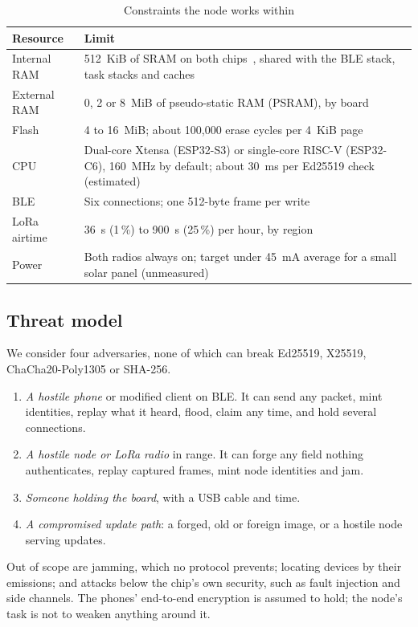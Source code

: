 \documentclass[conference]{IEEEtran}
\begin{document}
\begin{table}[t]
\caption{Constraints the node works within}
\label{tab:constraints}
\centering
\scriptsize
\begin{tabular}{@{}L{1.75cm}L{5.95cm}@{}}
\toprule
Resource & Limit \\
\midrule
Internal RAM & 512~KiB of SRAM on both chips~\cite{esp32s3,esp32c6}, shared with the BLE stack, task stacks and caches \\
External RAM & 0, 2 or 8~MiB of pseudo-static RAM (PSRAM), by board \\
Flash & 4 to 16~MiB; about 100{,}000 erase cycles per 4~KiB page \\
CPU & Dual-core Xtensa (ESP32-S3) or single-core RISC-V (ESP32-C6), 160~MHz by default; about 30~ms per Ed25519 check (estimated) \\
BLE & Six connections; one 512-byte frame per write \\
LoRa airtime & 36~s (1\,\%) to 900~s (25\,\%) per hour, by region \\
Power & Both radios always on; target under 45~mA average for a small solar panel (unmeasured) \\
\bottomrule
\end{tabular}
\end{table}

\subsection{Threat model}
We consider four adversaries, none of which can break Ed25519, X25519, ChaCha20-Poly1305 or SHA-256.
{\renewcommand{\labelenumi}{A\arabic{enumi}.}
\begin{enumerate}
\item \emph{A hostile phone} or modified client on BLE. It can send any packet, mint identities, replay what it heard, flood, claim any time, and hold several connections.
\item \emph{A hostile node or LoRa radio} in range. It can forge any field nothing authenticates, replay captured frames, mint node identities and jam.
\item \emph{Someone holding the board}, with a USB cable and time.
\item \emph{A compromised update path}: a forged, old or foreign image, or a hostile node serving updates.
\end{enumerate}}
Out of scope are jamming, which no protocol prevents; locating devices by their emissions; and attacks below the chip's own security, such as fault injection and side channels. The phones' end-to-end encryption is assumed to hold; the node's task is not to weaken anything around it.
\end{document}
